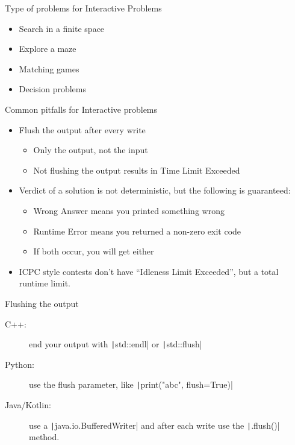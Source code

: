 \documentclass[11pt,pdf, aspectratio=169]{beamer}
\begin{document}
  \begin{frame}{Type of problems for Interactive Problems}
    \begin{itemize}
      \item Search in a finite space
      \item Explore a maze
      \item Matching games
      \item Decision problems
    \end{itemize}
  \end{frame}
  \begin{frame}{Common pitfalls for Interactive problems}
    \begin{itemize}
      \item Flush the output after every write
      \begin{itemize}
        \item Only the output, not the input
        \item Not flushing the output results in Time Limit Exceeded
      \end{itemize}
      \item Verdict of a solution is not deterministic, but the following is guaranteed:
      \begin{itemize}
        \item Wrong Answer means you printed something wrong
        \item Runtime Error means you returned a non-zero exit code
        \item If both occur, you will get either
      \end{itemize}
      \item ICPC style contests don't have ``Idleness Limit Exceeded'', but a total runtime limit.
    \end{itemize}
  \end{frame}
  \begin{frame}{Flushing the output}
    \begin{description}
      \item[C++:] end your output with \texttt|std::endl| or \texttt|std::flush|
      \item[Python:] use the flush parameter, like \texttt|print("abc", flush=True)|
      \item[Java/Kotlin:] use a \texttt|java.io.BufferedWriter| and after each write use the \texttt|.flush()| method.
    \end{description}
  \end{frame}
\end{document}
